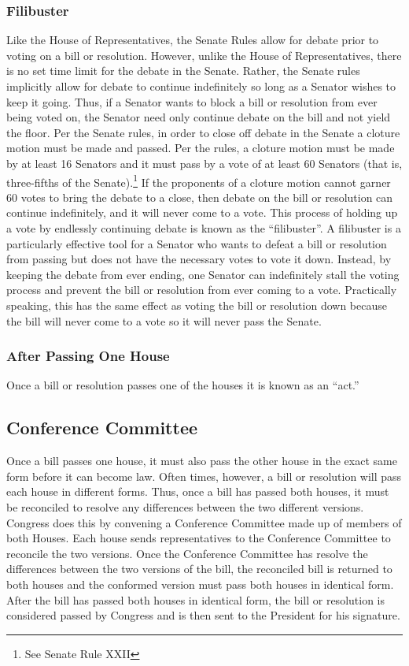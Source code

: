 \subsubsection{Filibuster}
Like the House of Representatives, the Senate Rules allow for debate prior to voting on a bill or resolution.  However, unlike the House of Representatives, there is no set time limit for the debate in the Senate.  Rather, the Senate rules implicitly allow for debate to continue indefinitely so long as a Senator wishes to keep it going.  Thus, if a Senator wants to block a bill or resolution from ever being voted on, the Senator need only continue debate on the bill and not yield the floor.  Per the Senate rules, in order to close off debate in the Senate a cloture motion must be made and passed.
Per the rules, a cloture motion must be made by at least 16 Senators and it must pass by a vote of at least 60 Senators (that is, three-fifths of the Senate).\footnote{See Senate Rule XXII}
If the proponents of a cloture motion cannot garner 60 votes to bring the debate to a close, then debate on the bill or resolution can continue indefinitely, and it will never come to a vote.  This process of holding up a vote by endlessly continuing debate is known as the ``filibuster''.  A filibuster is a particularly effective tool for a Senator who wants to defeat a bill or resolution from passing but does not have the necessary votes to vote it down.  Instead, by keeping the debate from ever ending, one Senator can indefinitely stall the voting process and prevent the bill or resolution from ever coming to a vote.  Practically speaking, this has the same effect as voting the bill or resolution down because the bill will never come to a vote so it will never pass the Senate.

\subsubsection{After Passing One House}
Once a bill or resolution passes one of the houses it is known as an ``act.''  

\subsection{Conference Committee}
Once a bill passes one house, it must also pass the other house in the exact same form before it can become law.  Often times, however, a bill or resolution will pass each house in different forms.  Thus, once a bill has passed both houses, it must be reconciled to resolve any differences between the two different versions.
Congress does this by convening a Conference Committee made up of members of both Houses.
Each house sends representatives to the Conference Committee to reconcile the two versions.
Once the Conference Committee has resolve the differences between the two versions of the bill, the reconciled bill is returned to both houses and the conformed version must pass both houses in identical form.
After the bill has passed both houses in identical form, the bill or resolution is considered passed by Congress and is then sent to the President for his signature.

